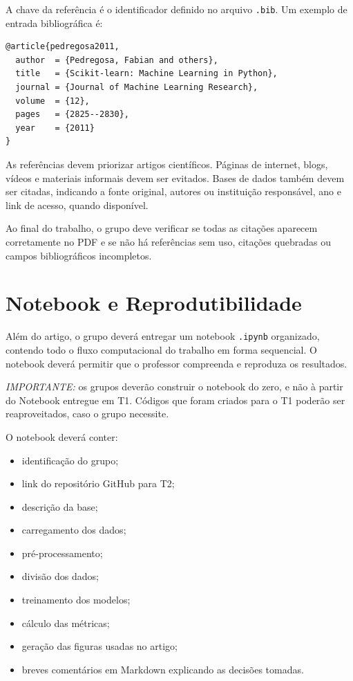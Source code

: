 \documentclass[a4paper]{ifacconf}
\begin{document}
A chave da referência é o identificador definido no arquivo \texttt{.bib}. Um exemplo de entrada bibliográfica é:
\begin{verbatim}
@article{pedregosa2011,
  author  = {Pedregosa, Fabian and others},
  title   = {Scikit-learn: Machine Learning in Python},
  journal = {Journal of Machine Learning Research},
  volume  = {12},
  pages   = {2825--2830},
  year    = {2011}
}
\end{verbatim}

As referências devem priorizar artigos científicos. Páginas de internet, blogs, vídeos e materiais informais devem ser evitados. Bases de dados também devem ser citadas, indicando a fonte original, autores ou instituição responsável, ano e link de acesso, quando disponível.

Ao final do trabalho, o grupo deve verificar se todas as citações aparecem corretamente no PDF e se não há referências sem uso, citações quebradas ou campos bibliográficos incompletos.


\section{Notebook e Reprodutibilidade}

Além do artigo, o grupo deverá entregar um notebook \texttt{.ipynb} organizado, contendo todo o fluxo computacional do trabalho em forma sequencial. O notebook deverá permitir que o professor compreenda e reproduza os resultados.

\textit{IMPORTANTE:} os grupos deverão construir o notebook do zero, e não à partir do Notebook entregue em T1. Códigos que foram criados para o T1 poderão ser reaproveitados, caso o grupo necessite. 

O notebook deverá conter:
\begin{itemize}
    \item identificação do grupo;
    \item link do repositório GitHub para T2;
    \item descrição da base;
    \item carregamento dos dados;
    \item pré-processamento;
    \item divisão dos dados;
    \item treinamento dos modelos;
    \item cálculo das métricas;
    \item geração das figuras usadas no artigo;
    \item breves comentários em Markdown explicando as decisões tomadas.
\end{itemize}
\end{document}
